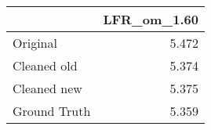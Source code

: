 \begin{tabular}{lr}
\toprule
{} & LFR_om_1.60 \\
\midrule
Original     &       5.472 \\
Cleaned old  &       5.374 \\
Cleaned new  &       5.375 \\
Ground Truth &       5.359 \\
\bottomrule
\end{tabular}
